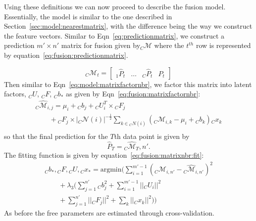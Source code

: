 Using these definitions we can now proceed to describe the fusion 
model. Essentially, the model is similar to the one described in 
Section~\ref{sec:model:nearestmatrix}, with the difference being 
the way we construct the feature vectors. Similar to Eqn~\ref{eq:predictionmatrix},
we construct a prediction  $m'\times n'$ matrix for fusion given by${}_C\mathcal{M}$ where 
the $t^{th}$ row is represented by equation~\ref{eq:fusion:predictionmatrix}.

\begin{equation}
  \label{eq:fusion:predictionmatrix}
  {}_C\mathcal{M}_{t} = \left[\begin{array}{llll}
      {}_1\widehat{P}_{t}& \dots & {}_C\widehat{P}_t & P_t 
    \end{array}
  \right]
\end{equation}
Then similar to Eqn~\ref{eq:model:matrixfactornbr}, we 
factor this matrix into latent factors, ${}_C U$, ${}_C F$, ${}_C b_*$ as 
given by Eqn~\ref{eq:fusion:matrixfactornbr}:
\begin{equation}
  \label{eq:fusion:matrixfactornbr}
  \begin{array}{l}
    {}_C \widehat{\mathcal{M}}_{i,j} =  \mu_i + {}_C b_{j} + {}_C U_i^T\times {}_C F_j \\
                                \qquad + {}_C F_j \times |{}_C \mathcal{N}(i)|^{-\frac{1}{2}}
    \sum_{k \in {}_C N(i)} ({}_C\mathcal{M}_{i,k} - \mu_i + {}_C b_{k}) {}_Cx_k \\
  \end{array}
\end{equation}
so that the final prediction for the
$T$th data point is given by
\[\widehat{P}_T = {}_C \widehat{\mathcal{M}}_T,n'.\]
The fitting function is given by equation~\ref{eq:fusion:matrixnbr:fit}:
\begin{equation}
  \label{eq:fusion:matrixnbr:fit}
  \begin{array}{l}
    {}_C b_*, {}_C F, {}_C U, {}_C x_*  = \textrm{argmin} (\sum \limits_{i=1}^{m'-1} \left({}_C \mathcal{M}_{i,n'} - {}_C \widehat{\mathcal{M}}_{i,n'}   \right)^2 \\
     \qquad + \lambda_3 (\sum \limits_{j=1}^{n'}{}_C b_j^2 + \sum \limits_{i=1}^{m'-1} ||{}_C U_i||^2 \\
     \qquad+ \sum \limits_{j=1}^{n'} ||{}_C F_j||^2 + \sum_k ||{}_C x_k||^2))
  \end{array}
\end{equation}
\noindent
As before the free parameters are estimated through cross-validation.

